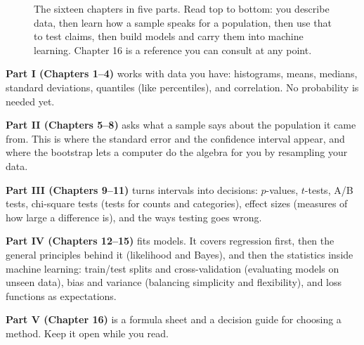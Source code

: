\begin{figure}[H]
\caption{The sixteen chapters in five parts. Read top to bottom: you describe
data, then learn how a sample speaks for a population, then use that to test
claims, then build models and carry them into machine learning.
Chapter 16 is a reference you can consult at any point.}
\label{fig:pre-roadmap}
\end{figure}

\textbf{Part I (Chapters 1--4)} works with data you have: histograms,
means, medians, standard deviations, quantiles (like percentiles), and correlation. No probability
is needed yet.

\textbf{Part II (Chapters 5--8)} asks what a sample says about the population
it came from. This is where the standard error and the confidence interval
appear, and where the bootstrap lets a computer do the algebra for you by resampling your data.

\textbf{Part III (Chapters 9--11)} turns intervals into decisions: $p$-values,
$t$-tests, A/B tests, chi-square tests (tests for counts and categories), effect sizes (measures of how large a difference is), and the ways testing
goes wrong.

\textbf{Part IV (Chapters 12--15)} fits models. It covers regression first, then the
general principles behind it (likelihood and Bayes), and then the statistics inside
machine learning: train/test splits and cross-validation (evaluating models on unseen data), bias and variance (balancing simplicity and flexibility), and
loss functions as expectations.

\textbf{Part V (Chapter 16)} is a formula sheet and a decision guide for
choosing a method. Keep it open while you read.

